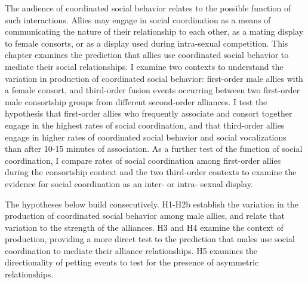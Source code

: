 \documentclass[11pt]{amsart}
\begin{document}
The audience of coordinated social behavior relates to the possible function of such interactions. Allies may engage in social coordination as a means of communicating the nature of their relationship to each other, as a mating display to female consorts, or as a display used during intra-sexual competition. 
%
This chapter examines the prediction that allies use coordinated social behavior to mediate their social relationships. I examine two contexts to understand the variation in production of coordinated social behavior: first-order male allies with a female consort, and third-order fusion events occurring between two first-order male consortship groups from different second-order alliances. I test the hypothesis that first-order allies who frequently associate and consort together engage in the highest rates of social coordination, and that third-order allies engage in higher rates of coordinated social behavior and social vocalizations than after 10-15 minutes of association. As a further test of the function of social coordination, I compare rates of social coordination among first-order allies during the consortship context and the two third-order contexts to examine the evidence for social coordination as an inter- or intra- sexual display.


The hypotheses below build consecutively. H1-H2b establish the variation in the production of coordinated social behavior among male allies, and relate that variation to the strength of the alliances. H3 and H4 examine the context of production, providing a more direct test to the prediction that males use social coordination to mediate their alliance relationships. H5 examines the directionality of petting events to test for the presence of asymmetric relationships. 
\end{document}
